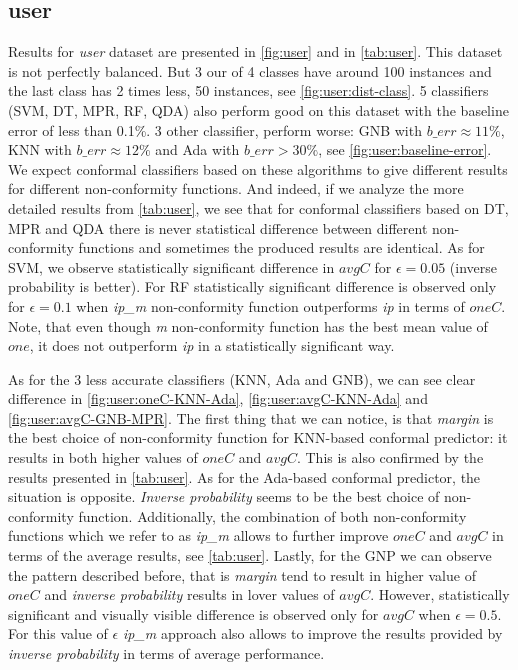 \subsection{user}

Results for \textit{user} dataset are presented in \cref{fig:user} and in \cref{tab:user}. This 
dataset is not perfectly balanced. But 3 our of 4 classes have around 100 instances and the last
class has 2 times less, 50 instances, see \cref{fig:user:dist-class}. 5 classifiers (SVM, DT, 
MPR, RF, QDA) also perform good on this dataset with the baseline error of less than 0.1\%. 3 
other classifier, perform worse: GNB with $b\_err \approx 11\%$, KNN with $b\_err \approx 12\%$ 
and Ada with $b\_err > 30\%$, see \cref{fig:user:baseline-error}. We expect conformal 
classifiers based on these algorithms to give different results for different non-conformity 
functions.
And indeed, if we analyze the more detailed results from \cref{tab:user}, we see that for 
conformal classifiers based on DT, MPR and QDA there is never statistical difference between 
different non-conformity functions and sometimes the produced results are identical. As for SVM,
we observe statistically significant difference in $avgC$ for $\epsilon = 0.05$ (inverse 
probability is better). For RF statistically significant difference is observed only for 
$\epsilon=0.1$ when \textit{ip\_m} non-conformity function outperforms \textit{ip} in terms of 
$oneC$. Note, that even though \textit{m} non-conformity function has the best mean value of 
$one$, it does not outperform \textit{ip} in a statistically significant way.

As for the 3 less accurate classifiers (KNN, Ada and GNB), we can see clear difference in 
\cref{fig:user:oneC-KNN-Ada}, \cref{fig:user:avgC-KNN-Ada} and \cref{fig:user:avgC-GNB-MPR}.
The first thing that we can notice, is that \textit{margin} is the best choice of non-conformity
function for KNN-based conformal predictor: it results in both higher values of $oneC$ and 
$avgC$. This is also confirmed by the results presented in \cref{tab:user}. As for the Ada-based
conformal predictor, the situation is opposite. \textit{Inverse probability} seems to be the
best choice of non-conformity function. Additionally, the combination of both non-conformity
functions which we refer to as \textit{ip\_m} allows to further improve $oneC$ and $avgC$ in
terms of the average results, see \cref{tab:user}. Lastly, for the GNP we can observe the 
pattern described before, that is \textit{margin} tend to result in higher value of $oneC$
and \textit{inverse probability} results in lover values of $avgC$. However, statistically 
significant and visually visible difference is observed only for $avgC$ when $\epsilon=0.5$.
For this value of $\epsilon$ \textit{ip\_m} approach also allows to improve the results provided by \textit{inverse probability} in terms of average performance.

